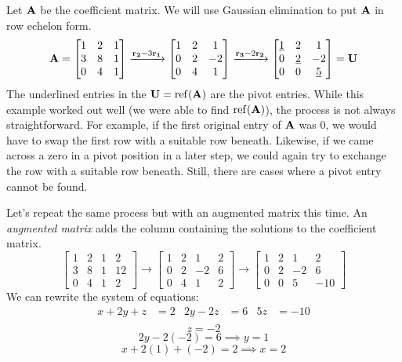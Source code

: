 \documentclass[../main.tex]{subfiles}
\begin{document}
\begin{solution} \label{sol:linear_sys_1}
	Let $\mathbf{A}$ be the coefficient matrix. We will use Gaussian elimination to
	put $\mathbf{A}$ in row echelon form.
	\[\mathbf{A}=\begin{bmatrix}1&2&1\\3&8&1\\0&4&1\end{bmatrix}
		\xrightarrow{\mathbf{r_2}-3\mathbf{r_1}} \begin{bmatrix}1&2&1\\0&2&-2\\0&4&1\end{bmatrix}
		\xrightarrow{\mathbf{r_3}-2\mathbf{r_2}} \begin{bmatrix}\underline{1}&2&1\\0&\underline{2}&-2\\0&0&\underline{5}\end{bmatrix}=\mathbf{U} \]
	The underlined entries in the $\mathbf{U}=\operatorname{ref}(\mathbf{A})$ are the pivot entries.
	While this example worked out well (we were able to find $\operatorname{ref}(\mathbf{A})$),
	the process is not always straightforward. For example, if the first original
	entry of $\mathbf{A}$ was $0$, we would have to swap the first row with a suitable row beneath.
	Likewise, if we came across a zero in a pivot position in a later step, we could again try to exchange
	the row with a suitable row beneath. Still, there are cases where a pivot entry cannot be found.

	Let's repeat the same process but with an augmented matrix this time.
	An \textit{augmented matrix} adds the column containing the solutions to
	the coefficient matrix.
	\[\left[\begin{array}{rrr|r}
				1 & 2 & 1 & 2  \\
				3 & 8 & 1 & 12 \\
				0 & 4 & 1 & 2
			\end{array}\right]\to
		\left[\begin{array}{rrr|r}
				1 & 2 & 1  & 2 \\
				0 & 2 & -2 & 6 \\
				0 & 4 & 1  & 2
			\end{array}\right]\to
		\left[\begin{array}{rrr|r}
				1 & 2 & 1  & 2   \\
				0 & 2 & -2 & 6   \\
				0 & 0 & 5  & -10
			\end{array}\right]\]
	We can rewrite the system of equations:
	\begin{align*}
		x+2y+z & =2 & 2y-2z & =6 & 5z & =-10 \\
	\end{align*}
	\[z=-2\]
	\[2y-2(-2)=6\implies y=1\]
	\[x+2(1)+(-2)=2\implies x=2\]
	\flushright
	\qedsymbol
\end{solution}
\end{document}
